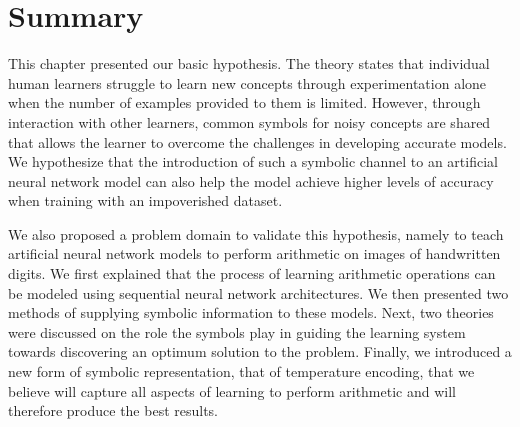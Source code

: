 \section{Summary} \label{sec:theory-summary}

This chapter presented our basic hypothesis. The theory states that individual human learners struggle to learn new concepts through experimentation alone when the number of examples provided to them is limited. However, through interaction with other learners, common symbols for noisy concepts are shared that allows the learner to overcome the challenges in developing accurate models. We hypothesize that the introduction of such a symbolic channel to an artificial neural network model can also help the model achieve higher levels of accuracy when training with an impoverished dataset.

We also proposed a problem domain to validate this hypothesis, namely to teach artificial neural network models to perform arithmetic on images of handwritten digits. We first explained that the process of learning arithmetic operations can be modeled using sequential neural network architectures. We then presented two methods of supplying symbolic information to these models. Next, two theories were discussed on the role the symbols play in guiding the learning system towards discovering an optimum solution to the problem. Finally, we introduced a new form of symbolic representation, that of temperature encoding, that we believe will capture all aspects of learning to perform arithmetic and will therefore produce the best results. 